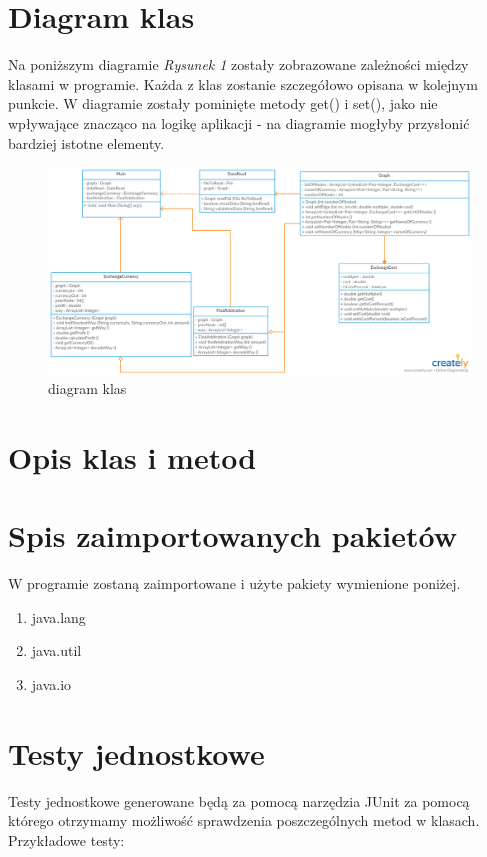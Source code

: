 ﻿\documentclass[12pt]{article}
\begin{document}
 
\section{Diagram klas}
Na poniższym diagramie \emph{Rysunek 1} zostały zobrazowane zależności między klasami w programie. Każda z klas zostanie szczegółowo opisana w kolejnym punkcie. W diagramie zostały pominięte metody get() i set(), jako nie wpływające znacząco na logikę aplikacji - na diagramie mogłyby przysłonić bardziej istotne elementy.

\begin{figure}[h!]
\centering
\includegraphics[scale=0.5]{diagram}
\caption{diagram klas}
\label{fig:diagram}
\end{figure}

\section{Opis klas i metod}

\section{Spis zaimportowanych pakietów}
W programie zostaną zaimportowane i użyte pakiety wymienione poniżej. 
\begin{enumerate}
    \item java.lang
    \item java.util
    \item java.io
    
\end{enumerate}

\section{Testy jednostkowe}
Testy jednostkowe generowane będą za pomocą narzędzia JUnit za pomocą którego otrzymamy możliwość sprawdzenia poszczególnych metod w klasach.
Przykładowe testy:
\end{document}
